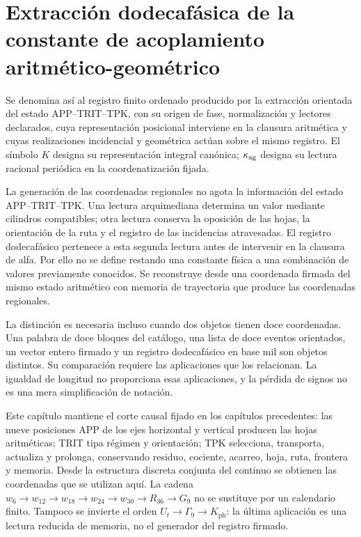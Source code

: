 \section{Extracción dodecafásica de la constante de acoplamiento aritmético-geométrico}
\label{sec:k-registro}

\begin{definition}
\label{lib01:definicion}
Se denomina así al registro finito ordenado producido por la extracción
orientada del estado APP--TRIT--TPK, con su origen de fase, normalización y
lectores declarados, cuya representación posicional interviene en la
clausura aritmética y cuyas realizaciones incidencial y geométrica actúan
sobre el mismo registro. El símbolo \(K\) designa su representación
integral canónica; \(\kappa_{\rm ag}\) designa su lectura racional
periódica en la coordenatización fijada.
\end{definition}

La generación de las coordenadas regionales no agota la información del
estado APP--TRIT--TPK. Una lectura arquimediana determina un valor mediante
cilindros compatibles; otra lectura conserva la oposición de las hojas, la
orientación de la ruta y el registro de las incidencias atravesadas. El
registro dodecafásico pertenece a esta segunda lectura antes de intervenir en
la clausura de alfa. Por ello no se define restando una constante física a
una combinación de valores previamente conocidos. Se reconstruye desde una
coordenada firmada del mismo estado aritmético con memoria de trayectoria que produce las coordenadas
regionales.

La distinción es necesaria incluso cuando dos objetos tienen doce
coordenadas. Una palabra de doce bloques del catálogo, una lista de doce
eventos orientados, un vector entero firmado y un registro dodecafásico en base mil son
objetos distintos. Su comparación requiere las aplicaciones que los
relacionan. La igualdad de longitud no proporciona esas aplicaciones, y la
pérdida de signos no es una mera simplificación de notación.

Este capítulo mantiene el corte causal fijado en los capítulos precedentes:
las nueve posiciones APP de los ejes horizontal y vertical producen las
hojas aritméticas; TRIT tipa régimen y orientación; TPK selecciona,
transporta, actualiza y prolonga, conservando residuo, cociente, acarreo,
hoja, ruta, frontera y memoria. Desde la estructura discreta conjunta del
continuo se obtienen las coordenadas que se utilizan aquí. La cadena
\(w_6\to w_{12}\to w_{18}\to w_{24}\to w_{30}\to R_{36}\to G_9\)
no se sustituye por un calendario finito. Tampoco se invierte el orden
\(U_t\to\Gamma_9\to K_{\mathrm{ph}}\): la última aplicación es una
lectura reducida de memoria, no el generador del registro firmado.

